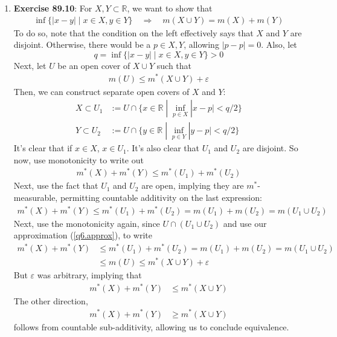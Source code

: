 \documentclass[12pt]{article}
\theoremstyle{plain}
\theoremstyle{definition}
\theoremstyle{remark}
\begin{document}
\begin{enumerate}
\item \textbf{Exercise 89.10}: For $X,Y\subset\mathbb{R}$, we want to show that  
\begin{align*}
    \inf\{|x-y| \; |\; x\in X, y\in Y\} 
    \quad \Rightarrow\quad
    m(X\cup Y) = m(X) + m(Y)
\end{align*}
To do so, note that the condition on the left effectively says that $X$ and $Y$ are disjoint. Otherwise, there would be a $p\in X, Y$, allowing $|p-p|=0$. Also, let 
\[
    q =
    \inf\{|x-y| \; |\; x\in X, y\in Y\}  > 0
\]
Next, let $U$ be an open cover of $X \cup Y$ such that 
\begin{align}
    \label{q6.approx}
    m(U) \leq m^*(X \cup Y) + \varepsilon
\end{align}
Then, we can construct separate open covers of $X$ and $Y$: 
\begin{align*}
    X \subset U_1 &:= U \cap \{x \in \mathbb{R} \; | \; \inf_{p\in X} |x-p| < q/2 \} \\
    Y \subset U_2 &:= U \cap \{y \in \mathbb{R} \; | \; \inf_{p\in Y} |y-p| < q/2 \}
\end{align*}
It's clear that if $x\in X$, $x\in U_1$. It's also clear that $U_1$ and $U_2$ are disjoint. So now, use monotonicity to write out
\begin{align*}
    m^*(X) + m^*(Y) \leq 
    m^*(U_1) + m^*(U_2)
\end{align*}
Next, use the fact that $U_1$ and $U_2$ are open, implying they are $m^*$-measurable, permitting countable additivity on the last expression:
\begin{align*}
    m^*(X) + m^*(Y) \leq 
    m^*(U_1) + m^*(U_2)= 
    m(U_1) + m(U_2)= m(U_1\cup U_2)
\end{align*}
Next, use the monotonicity again, since $U\cap (U_1 \cup U_2)$ and use our approximation (\ref{q6.approx}), to write
\begin{align*}
    m^*(X) + m^*(Y) &\leq 
    m^*(U_1) + m^*(U_2)= 
    m(U_1) + m(U_2)= m(U_1\cup U_2)\\
    &\leq m(U) \leq m^*(X \cup Y) + \varepsilon
\end{align*}
But $\varepsilon$ was arbitrary, implying that
\begin{align*}
    m^*(X) + m^*(Y) &\leq 
    m^*(X \cup Y)
\end{align*}
The other direction, 
\begin{align*}
    m^*(X) + m^*(Y) &\geq 
    m^*(X \cup Y)
\end{align*}
follows from countable sub-additivity, allowing us to conclude equivalence. 





\end{enumerate}
\end{document}
